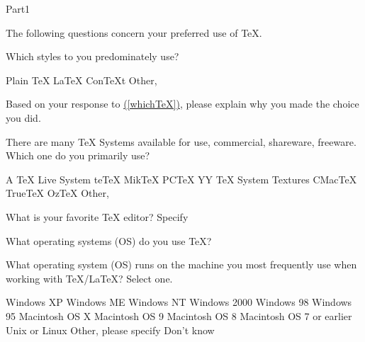 \documentclass{article}
\begin{document}
\begin{exam}{Part1}
\begin{problem*}
The following questions concern your preferred use of \TeX.
\begin{parts}
\item\label{whichTeX} Which styles to you predominately use?
\begin{answers}{4}
\rowsep{1bp}
\bChoices[2]
     Plain \TeX\eAns
     \LaTeX\eAns
     Con\TeX t\eAns
     Other, \eAns
\eChoices
\end{answers}

\item Based on your response to \hyperref[whichTeX]{(\ref*{whichTeX})},
please explain why you made the choice you did.
\begin{solution}[.75in]
\end{solution}


\item There are many {\TeX} Systems available for use, commercial,
shareware, freeware. Which one do you primarily use?
\begin{answers}{4}
\rowsep{1bp}
\bChoices
     A \TeX{} Live System\eAns
     te\TeX\eAns
     Mik\TeX\eAns
     PC\TeX\eAns
     Y\negthinspace{\scriptsize\&}\negthinspace Y \TeX{} System\eAns
     Textures\eAns
     CMac\TeX\eAns
     True\TeX\eAns
     Oz\TeX\eAns
     Other, \eAns
\eChoices
\end{answers}

\item What is your favorite {\TeX} editor? Specify \fillin{1.75in}{\empty}

\end{parts}
\end{problem*}

\begin{problem*}
What operating systems (OS) do you use \TeX?

\setlength\columnseprule{0pt}

\begin{parts}

\item What operating system (OS) runs on the machine you
most frequently use when working with \TeX/\LaTeX? Select one.
\begin{multicols}{2}
\begin{answers}{1}
\bChoices
      Windows XP\eAns
      Windows ME\eAns
      Windows NT\eAns
      Windows 2000\eAns
      Windows 98\eAns
      Windows 95\eAns
      Macintosh OS X\eAns
      Macintosh OS 9\eAns
      Macintosh OS 8\eAns
      Macintosh OS 7 or earlier\eAns
      Unix or Linux\eAns
      Other, please specify \fillin{1.25in}{\empty}\eAns
      Don't know\eAns
\eChoices
\end{answers}
\end{multicols}


\end{parts}
\end{problem*}
\end{exam}
\end{document}
